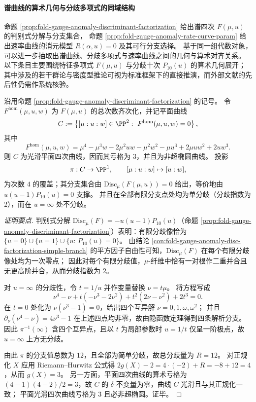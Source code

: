 
\paragraph{谱曲线的算术几何与分歧多项式的同域结构}\label{par:fold-gauge-anomaly-spectral-curve-arithmetic}
命题 \ref{prop:fold-gauge-anomaly-discriminant-factorization} 给出谱四次 \(F(\mu,u)\) 的判别式分解与分支集合，
命题 \ref{prop:fold-gauge-anomaly-rate-curve-param} 给出速率曲线的消元模型 \(R(\alpha,u)=0\) 及其可行分支选择。
基于同一组代数对象，可以进一步抽取出谱曲线、分歧多项式与速率曲线之间的几何与算术对齐关系。
以下条目主要围绕特征多项式 \(F(\mu,u)\) 与分歧十次 \(P_{10}(u)\) 的算术几何展开；
其中涉及的若干群论与密度型推论可视为标准框架下的直接推演，而外部文献的先后性仍需作系统核验。

\begin{proposition}\label{prop:fold-gauge-anomaly-spectral-quartic-geometry}
沿用命题 \ref{prop:fold-gauge-anomaly-discriminant-factorization} 的记号。
令 \(F^{\mathrm{hom}}(\mu,u,w)\) 为 \(F(\mu,u)\) 的总次数齐次化，并记平面曲线
\[
C:=\left\{[\mu:u:w]\in \PP^{2}:\ F^{\mathrm{hom}}(\mu,u,w)=0\right\},
\]
其中
\[
F^{\mathrm{hom}}(\mu,u,w)
=\mu^{4}-\mu^{3}w-2\mu^{2}uw-\mu^{2}w^{2}-\mu u^{3}+2\mu u w^{2}+2u w^{3}.
\]
则 \(C\) 为光滑平面四次曲线，因而其亏格为 \(3\)，并且为非超椭圆曲线。
投影
\[
\pi:C\to\PP^{1},\qquad [\mu:u:w]\mapsto [u:w],
\]
为次数 \(4\) 的覆盖；其分支集合由 \(\mathrm{Disc}_{\mu}(F(\mu,u))=0\) 给出，等价地由
\(
u(u-1)P_{10}(u)=0
\)
支撑。
并且在全部有限分支点处均为单分歧（分歧指数为 \(2\)），而在 \(u=\infty\) 处不分歧。
\end{proposition}
\begin{proof}[证明要点]
判别式分解 \(\mathrm{Disc}_{\mu}(F)=-u(u-1)P_{10}(u)\)（命题 \ref{prop:fold-gauge-anomaly-discriminant-factorization}）表明：有限分歧像恰为
\(\{u=0\}\cup\{u=1\}\cup\{u:\,P_{10}(u)=0\}\)。
由结论 \ref{con:fold-gauge-anomaly-disc-factorization-simple-branch} 的平方因子自由性可知，\(\mathrm{Disc}_{\mu}(F)\) 在每个有限分歧像处均为一次零点；
因此对每个有限分歧值，\(\mu\)-纤维中恰有一对根作二重并合且无更高阶并合，从而分歧指数为 \(2\)。
\par
对 \(u=\infty\) 的分歧性，令 \(t=1/u\) 并作变量替换 \(\nu=t\mu\)。
将方程写成
\[
\nu^{4}-\nu+t(-\nu^{3}-2\nu^{2})+t^{2}(2\nu-\nu^{2})+2t^{3}=0.
\]
在 \(t=0\) 处化为 \(\nu(\nu^{3}-1)=0\)，给出四个互异解 \(\nu=0,1,\omega,\omega^{2}\)；
并且 \(\partial_{\nu}(\nu^{4}-\nu)=4\nu^{3}-1\) 在上述四点均非零，故由隐函数定理得到四条解析分支。
因此 \(\pi^{-1}(\infty)\) 含四个互异点，且以 \(t\) 为局部参数时 \(u=1/t\) 仅呈一阶极点，故 \(u=\infty\) 上方无分歧。
\par
由此 \(\pi\) 的分支值总数为 \(12\)，且全部为简单分歧，故总分歧量为 \(R=12\)。
对正规化 \(X\) 应用 Riemann--Hurwitz 公式得
\(
2g(X)-2=4\cdot(-2)+R=-8+12=4
\)，从而 \(g(X)=3\)。
另一方面，平面四次曲线的算术亏格为 \((4-1)(4-2)/2=3\)，故 \(C\) 的 \(\delta\)-不变量为零，曲线 \(C\) 光滑且与其正规化一致；
平面光滑四次曲线亏格为 \(3\) 且必非超椭圆。证毕。
\end{proof}

